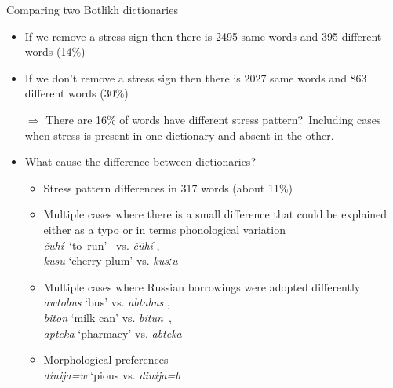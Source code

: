 \documentclass[13pt, t]{beamer}
\begin{document}
\begin{frame}{Comparing two Botlikh dictionaries}
\begin{itemize}
\item If we remove a stress sign then there is 2495 same words and 395 different words (14\%)
\item If we don't remove a stress sign then there is 2027 same words and 863 different words (30\%)
\item[\color{colorblue} $\Rightarrow$] There are 16\% of words have different stress pattern?\pause\ Including cases when stress is present in one dictionary and absent in the other. \pause 
\item What cause the difference between dictionaries?
\begin{itemize}
\item Stress pattern differences in 317 words (about 11\%)
\item Multiple cases where there is a small difference that could be explained either as a typo or in terms phonological variation \\ 
\hspace{-5em}\textit{čuhí}~`to~run’~\citep{alekseev2019}  vs. \textit{čũhí} \citep{saidovaabusov2012}, \\
\hspace{-5em}\textit{kusu} `cherry plum’ \citep{alekseev2019}  vs. \textit{kusːu} \citep{saidovaabusov2012}
\item Multiple cases where Russian borrowings were adopted differently \\ 
\hspace{-5em}\textit{awtobus} `bus’ \citep{alekseev2019} vs. \textit{abtabus} \citep{saidovaabusov2012}, \\
\hspace{-5em}\textit{biton} `milk can’ \citep{alekseev2019}  vs. \textit{bitun}~\citep{saidovaabusov2012}, \\
\hspace{-5em}\textit{apteka} `pharmacy’ \citep{alekseev2019} vs. \textit{abteka}~\citep{saidovaabusov2012}
\item Morphological preferences \\
\hspace{-5em}\textit{dinija=w} `pious \citep{alekseev2019} vs. \textit{dinija=b}~\citep{saidovaabusov2012} 
\end{itemize}
\end{itemize}
\end{frame}
\end{document}
